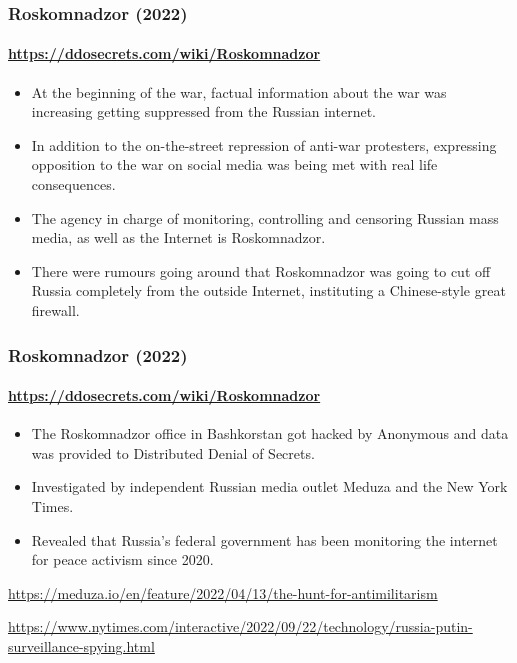 \documentclass[aspectratio=169,usenames,dvipsnames]{beamer}
\begin{document}
\begin{frame}
  \frametitle{Roskomnadzor (2022)}
  \framesubtitle{\url{https://ddosecrets.com/wiki/Roskomnadzor}}

  \begin{itemize}[<+->]
    \item At the beginning of the war, factual information
      about the war was increasing getting suppressed from the Russian
      internet.
    \item In addition to the on-the-street repression of anti-war protesters,
      expressing opposition to the war on social media was being
      met with real life consequences.
    \item The agency in charge of monitoring, controlling and censoring
      Russian mass media, as well as the Internet is Roskomnadzor.
    \item There were rumours going around that Roskomnadzor was going to cut
      off Russia completely from the outside Internet, instituting a
      Chinese-style great firewall.
  \end{itemize}
\end{frame}

\begin{frame}
  \frametitle{Roskomnadzor (2022)}
  \framesubtitle{\url{https://ddosecrets.com/wiki/Roskomnadzor}}

  \begin{itemize}[<+->]
    \item The Roskomnadzor office in Bashkorstan got hacked by Anonymous and
      data was provided to Distributed Denial of Secrets.
    \item Investigated by independent Russian media outlet Meduza and the New
      York Times.
    \item Revealed that Russia's federal government has been monitoring the
      internet for peace activism since 2020.
  \end{itemize}

  \vfill
  \centering \pause

  \footnotesize
  \url{https://meduza.io/en/feature/2022/04/13/the-hunt-for-antimilitarism}\\

  \vspace{1mm}

  \url{https://www.nytimes.com/interactive/2022/09/22/technology/russia-putin-surveillance-spying.html}

\end{frame}
\end{document}
